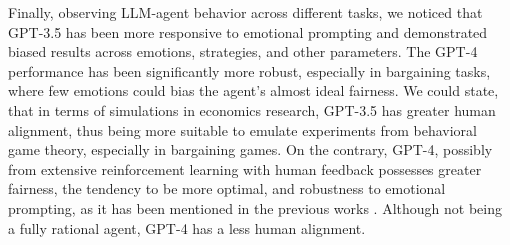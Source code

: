 \documentclass{article}
\begin{document}
Finally, observing LLM-agent behavior across different tasks, we noticed that GPT-3.5 has been more responsive to emotional prompting and demonstrated biased results across emotions, strategies, and other parameters. The GPT-4 performance has been significantly more robust, especially in bargaining tasks, where few emotions could bias the agent's almost ideal fairness. We could state, that in terms of simulations in economics research, GPT-3.5 has greater human alignment, thus being more suitable to emulate experiments from behavioral game theory, especially in bargaining games. On the contrary, GPT-4, possibly from extensive reinforcement learning with human feedback \cite{openai2023gpt4} possesses greater fairness, the tendency to be more optimal, and robustness to emotional prompting, as it has been mentioned in the previous works \cite{leng2023llm, pan2023rewards}. Although not being a fully rational agent, GPT-4 has a less human alignment. 
\end{document}
